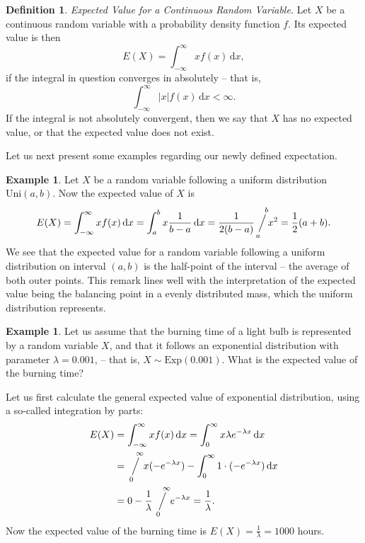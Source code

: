 \documentclass[12pt,a4paper,leqno]{report}
\newcommand{\dif}{\,\mathrm{d}}
\newcommand{\sijoitus}[2]{\mathop{\Big/}\limits_{\hspace{-0.85em}{#1}}^{\hspace{0.85em}{#2}}\hspace{-0.2em}}
\theoremstyle{plain}
\theoremstyle{definition}
\newtheorem{maar}[equation]{Definition}
\newtheorem{esim}[equation]{Example}
\begin{document}
\begin{maar}
\emph{Expected Value for a Continuous Random Variable.}  Let $X$ be a continuous random variable with a probability density function $f$. Its expected value is then 
\[
E(X) = \int_{-\infty}^\infty x f(x) \dif x,
\]
if the integral in question converges in absolutely -- that is,
\[
\int_{-\infty}^\infty |x| f(x) \dif x < \infty.
\]
If the integral is not absolutely convergent, then we say that $X$ has no expected value, or that the expected value does not exist.
\end{maar}

Let us next present some examples regarding our newly defined expectation.

\begin{esim}
Let $X$ be a random variable following a uniform distribution $\text{Uni}(a,b)$. Now the expected value of $X$ is
\[ 
E(X) = \int_{-\infty}^\infty x f(x) \dif x = \int_a^b x \frac{1}{b-a} \dif x = \frac{1}{2(b-a)}\sijoitus{a}{b} x^2 = \frac{1}{2}(a+b).
\]
We see that the expected value for a random variable following a uniform distribution on interval $(a,b)$ is the half-point of the interval -- the average of both outer points. This remark lines well with the interpretation of the expected value being the balancing point in a evenly distributed mass, which the uniform distribution represents.
\end{esim}

\begin{esim}
\label{esim:bulb2}
Let us assume that the burning time of a light bulb is represented by a random variable $X$, and that it follows an exponential distribution with parameter $\lambda = 0.001$, -- that is, $X \sim \text{Exp}(0.001)$. What is the expected value of the burning time?

Let us first calculate the general expected value of exponential distribution, using a so-called integration by parts:
\[
\begin{split}
E(X) &= \int_{-\infty}^\infty x f(x) \dif x = \int_0^\infty x \lambda e^{-\lambda x} \dif x \\
	   &= \sijoitus{0}{\infty} x(-e^{-\lambda x}) - \int_0^\infty 1 \cdot  (-e^{-\lambda x}) \dif x \\
	   &= 0 - \frac{1}{\lambda}\sijoitus{0}{\infty} e^{-\lambda x} = \frac{1}{\lambda}.
\end{split}
\]
Now the expected value of the burning time is $E(X) = \frac{1}{\lambda} = 1000$ hours.
\end{esim}
\end{document}
